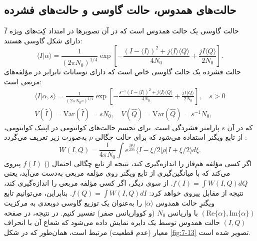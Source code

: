 \subsection{حالت‌های همدوس، حالت گاوسی و حالت‌های فشرده}
\label{subsec:7-5-2}
حالت گاوسی یک حالت همدوس است که در آن تصویرها در امتداد کِت‌های ویژه $\hat{I}$ دارای شکل گاوسی هستند:
\begin{equation}
	\langle I|\alpha \rangle = \frac{1}{(2\pi N_0)^{1/4}} \exp\left[ -\frac{(I-\langle I \rangle)^2 + j\langle I \rangle \langle Q \rangle}{4N_0} + \frac{j I \langle Q \rangle}{2N_0} \right].
	\label{eq:7-78}
\end{equation}
حالت فشرده یک حالت گاوسی خاص است که دارای نوسانات نابرابر در مؤلفه‌های مربعی است:
\begin{equation}
	\begin{aligned}
		\langle I|\alpha, s \rangle = \frac{1}{(2\pi N_0 s)^{1/4}} \exp\left[ -\frac{s^{-1}(I-\langle I \rangle)^2 + j\langle I \rangle \langle Q \rangle}{4N_0} + \frac{j I \langle Q \rangle}{2N_0} \right], \quad s > 0 \\
		V(\hat{I}) = \text{Var}(\hat{I}) = sN_0, \quad V(\hat{Q}) = \text{Var}(\hat{Q}) = s^{-1} N_0,
	\end{aligned}
	\label{eq:7-79}
\end{equation}
که در آن $s$ پارامتر فشردگی است.
برای تجسم حالت‌های کوانتومی در اپتیک کوانتومی، از تابع ویگنر استفاده می‌شود که برای حالت چگالی $\rho$ به‌صورت زیر تعریف می‌گردد \cite{7-7}:
\begin{equation}
	W(I, Q) = \frac{1}{4\pi N_0} \int e^{\frac{j \xi Q}{2N_0}} \langle I - \xi/2 | \rho | I + \xi/2 \rangle d\xi.
	\label{eq:7-80}
\end{equation}
اگر کسی مؤلفه هم‌فاز را اندازه‌گیری کند، نتیجه از تابع چگالی احتمال () $f(I)$ پیروی می‌کند که با میانگین‌گیری از تابع ویگنر روی مؤلفه مربعی به‌دست می‌آید، یعنی $f(I) = \int W(I, Q) dQ$. از سوی دیگر، اگر کسی مؤلفه مربعی را اندازه‌گیری کند، نتیجه از  مقابل پیروی خواهد کرد: $f(Q) = \int W(I, Q) dI$. بنابراین، می‌توانیم تابع ویگنرِ حالت همدوس $|\alpha\rangle$ را به‌عنوان یک توزیع گاوسی دو‌بعدی به مرکزیت $(\text{Re}\{\alpha\}, \text{Im}\{\alpha\})$ با واریانس $N_0$ (و کوواریانس صفر) تفسیر کنیم. در نتیجه، در صفحه $(I, Q)$ حالت همدوس توسط یک دایره نمایش داده می‌شود که شعاع آن با انحراف معیار (عدم قطعیت) مرتبط است، همان‌طور که در شکل \ref{fig:7-13} تصویر شده است.






